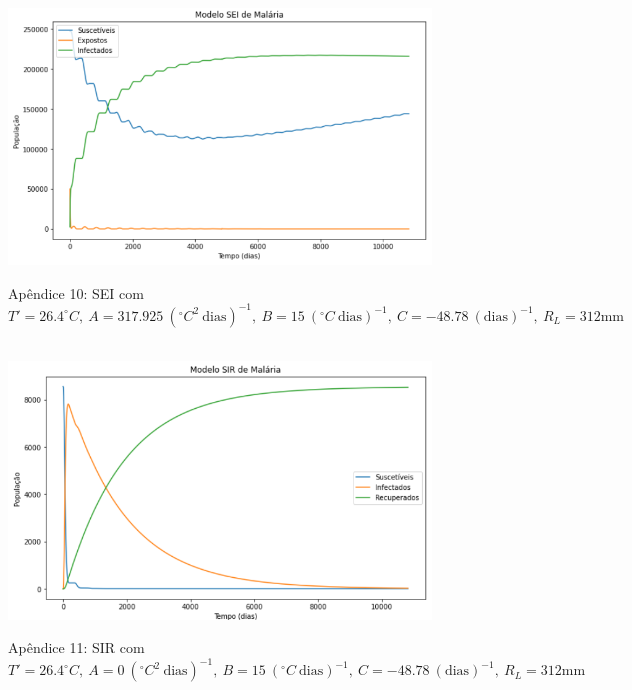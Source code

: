 \documentclass[12pt]{article}
\begin{document}
\begin{figure}[!ht]
        \centering
        \hbox{\hspace{3.5em} \includegraphics[scale=0.6] {SEI_Correcao_max_A317.png}}
        \caption*{Apêndice 10: SEI com $T'=26.4^\circ C, \ A=317.925 \ (^\circ C^2 \ \text{dias})^{-1}, \ B=15 \ (^\circ C \ \text{dias})^{-1}, \ C=-48.78 \ (\text{dias})^{-1}, \ R_L=312 \text{mm}$}
\end{figure}
\newpage
\begin{figure}[!ht]
        \centering
        \hbox{\hspace{4.0em} \includegraphics[scale=0.6] {SIR_Correcao_max_A0.png}}
        \caption*{Apêndice 11: SIR com $T'=26.4^\circ C, \ A=0 \ (^\circ C^2 \ \text{dias})^{-1}, \ B=15 \ (^\circ C \ \text{dias})^{-1}, \ C=-48.78 \ (\text{dias})^{-1}, \ R_L=312 \text{mm}$}
\end{figure} 
\end{document}
